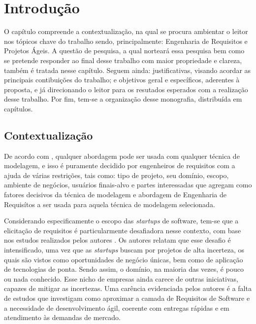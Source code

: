 
\chapter[Introdução]{Introdução}
O capítulo compreende a contextualização, na qual se procura ambientar o leitor nos tópicos chave do trabalho sendo, principalmente: Engenharia de Requisitos e Projetos Ágeis. A questão de pesquisa, a qual norteará essa pesquisa bem como se pretende responder ao final desse trabalho com maior propriedade e clareza, também é tratada nesse capítulo. Seguem ainda: justificativas, visando  acordar as principais contibuições do trabalho; e objetivos geral e específicos, aderentes à proposta, e já direcionando o leitor para os resutados esperados com a realização desse trabalho. Por fim, tem-se a organização desse monografia, distribuída em capítulos. 

\section{Contextualização}
De acordo com \cite{tabassam2019comparative}, qualquer abordagem pode ser usada com qualquer técnica de modelagem, e isso é puramente decidido por engenheiros de requisitos com a ajuda de várias restrições, tais como: tipo de projeto, seu domínio, escopo, ambiente de negócios, usuários finais-alvo e partes interessadas que agregam como fatores decisivos da técnica de modelagem e abordagem de Engenharia de Requisítos a ser usada para aquela técnica de modelagem selecionada.

Considerando especificamente o escopo das  \textit{startups} de software, tem-se que a elicitação de requisitos 
é particularmente desafiadora nesse contexto, com base nos estudos realizados pelos autores \cite{rafiq2017requirements}. Os autores relatam que esse desafio é intensificado, uma vez que as \textit{startups} buscam por projetos de alta incerteza, os quais são vistos como oportunidades de negócio únicas, bem como de aplicação de tecnologias de ponta. Sendo assim, o domínio, na maioria das vezes, é pouco ou nada conhecido. Esse nicho de empresas ainda carece de outras iniciativas, capazes de mitigar as incertezas. Uma carência evidenciada pelos autores  \cite{rafiq2017requirements} é a falta de estudos que investigam como aproximar a camada de Requisitos de Software e a necessidade de desenvolvimento ágil, coerente com entregas rápidas e em atendimento às demandas de mercado.


